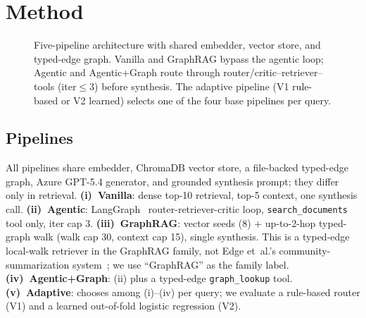 \section{Method}
\label{sec:method}

\begin{figure}[t!]
  \centering
  \resizebox{0.42\textwidth}{!}{}%
  \caption{Five-pipeline architecture with shared embedder, vector store,
    and typed-edge graph. Vanilla and GraphRAG bypass the agentic loop;
    Agentic and Agentic+Graph route through router/critic--retriever--tools
    (iter${\leq}3$) before synthesis. The adaptive pipeline (V1 rule-based
    or V2 learned) selects one of the four base pipelines per query.}
  \label{fig:architecture}
\end{figure}

\subsection{Pipelines}
\label{sec:pipelines}
All pipelines share embedder, ChromaDB vector store, a file-backed
typed-edge graph, Azure GPT-5.4 generator, and grounded synthesis prompt; they
differ only in retrieval. \textbf{(i)~Vanilla}: dense top-10 retrieval,
top-5 context, one synthesis call. \textbf{(ii)~Agentic}: LangGraph~\cite{langgraph_software}
router-retriever-critic loop, \texttt{search\_documents} tool only, iter
cap 3. \textbf{(iii)~GraphRAG}: vector seeds (8) + up-to-2-hop typed-graph
walk (walk cap 30, context cap 15), single synthesis. This
is a typed-edge local-walk retriever in the GraphRAG family, not Edge
et~al.'s community-summarization system~\cite{graphrag2024}; we use
``GraphRAG'' as the family label. \textbf{(iv)~Agentic+Graph}: (ii) plus
a typed-edge \texttt{graph\_lookup} tool. \textbf{(v)~Adaptive}: chooses
among (i)--(iv) per query; we evaluate a rule-based router (V1) and a
learned out-of-fold logistic regression (V2).

